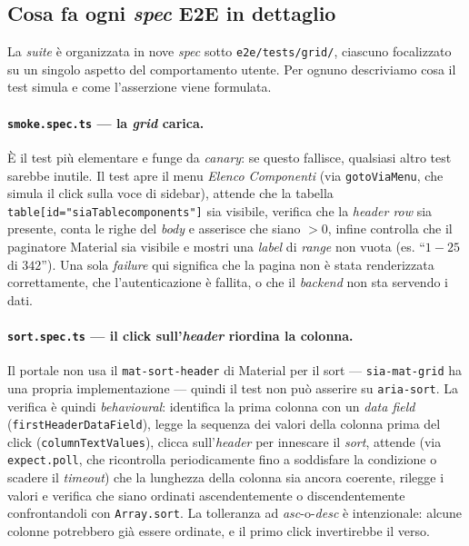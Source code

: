 \subsection{Cosa fa ogni \emph{spec} E2E in dettaglio}

La \emph{suite} è organizzata in nove \emph{spec} sotto \texttt{e2e/tests/grid/}, ciascuno focalizzato su un singolo aspetto del comportamento utente. Per ognuno descriviamo cosa il test simula e come l'asserzione viene formulata.

\paragraph{\texttt{smoke.spec.ts} — la \emph{grid} carica.} È il test più elementare e funge da \emph{canary}: se questo fallisce, qualsiasi altro test sarebbe inutile. Il test apre il menu \emph{Elenco Componenti} (via \texttt{gotoViaMenu}, che simula il click sulla voce di sidebar), attende che la tabella \texttt{table[id="siaTablecomponents"]} sia visibile, verifica che la \emph{header row} sia presente, conta le righe del \emph{body} e asserisce che siano $> 0$, infine controlla che il paginatore Material sia visibile e mostri una \emph{label} di \emph{range} non vuota (es. ``$1 - 25$ di $342$''). Una sola \emph{failure} qui significa che la pagina non è stata renderizzata correttamente, che l'autenticazione è fallita, o che il \emph{backend} non sta servendo i dati.

\paragraph{\texttt{sort.spec.ts} — il click sull'\emph{header} riordina la colonna.} Il portale non usa il \texttt{mat-sort-header} di Material per il sort — \texttt{sia-mat-grid} ha una propria implementazione — quindi il test non può asserire su \texttt{aria-sort}. La verifica è quindi \emph{behavioural}: identifica la prima colonna con un \emph{data field} (\texttt{firstHeaderDataField}), legge la sequenza dei valori della colonna prima del click (\texttt{columnTextValues}), clicca sull'\emph{header} per innescare il \emph{sort}, attende (via \texttt{expect.poll}, che ricontrolla periodicamente fino a soddisfare la condizione o scadere il \emph{timeout}) che la lunghezza della colonna sia ancora coerente, rilegge i valori e verifica che siano ordinati ascendentemente o discendentemente confrontandoli con \texttt{Array.sort}. La tolleranza ad \emph{asc}-o-\emph{desc} è intenzionale: alcune colonne potrebbero già essere ordinate, e il primo click invertirebbe il verso.

